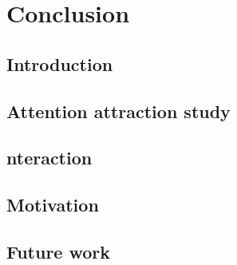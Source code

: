 \chapter{Conclusion} %

\label{Chapter10} %

\section{Introduction}



\section{Attention attraction study}
\section{nteraction}
\section{Motivation}
\section{Future work}


